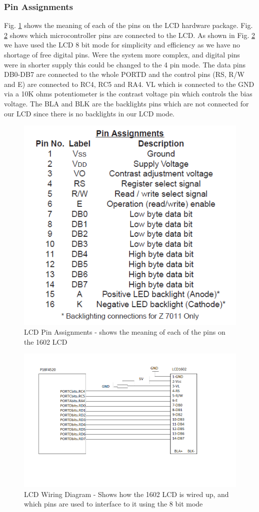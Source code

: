 \documentclass[]{report}
\begin{document}
\subsubsection{Pin Assignments}
Fig. \ref{fig:LCDPinAssignments} shows the meaning of each of the pins on the LCD hardware package. Fig. \ref{fig:LCDPinWiringDiagram} shows which microcontroller pins are connected to the LCD. As shown in Fig. \ref{fig:LCDPinWiringDiagram} we have used the LCD 8 bit mode for simplicity and efficiency as we have no shortage of free digital pins. Were the system more complex, and digital pins were in shorter supply this could be changed to the 4 pin mode. \newline
The data pins DB0-DB7 are connected to the whole PORTD and the control pins (RS, R/W and E) are connected to RC4, RC5 and RA4. VL which is connected to the GND via a 10K ohms potentiometer is the contrast voltage pin which controls the bias voltage. The BLA and BLK are the backlights pins which are not connected for our LCD since there is no backlights in our LCD mode.

\begin{figure}
\centering
\includegraphics[width=0.7\linewidth]{"../Diagrams/LCD Pin Assignments"}
\caption{LCD Pin Assignments - shows the meaning of each of the pins on the 1602 LCD}
\label{fig:LCDPinAssignments}
\end{figure}

\begin{figure}
\centering
\includegraphics[width=0.7\linewidth]{"../Diagrams/LCD Pin Wiring Diagram"}
\caption{LCD Wiring Diagram - Shows how the 1602 LCD is wired up, and which pins are used to interface to it using the 8 bit mode}
\label{fig:LCDPinWiringDiagram}
\end{figure}
\end{document}
